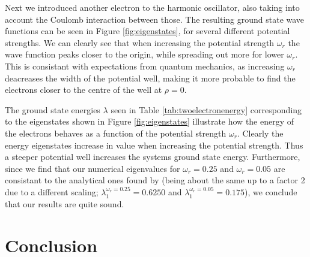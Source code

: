 \documentclass[twocolumn]{aastex62}
\begin{document}
Next we introduced another electron to the harmonic oscillator, also taking into account the Coulomb interaction between those. The resulting ground state wave functions can be seen in Figure \ref{fig:eigenstates}, for several different potential strengths. We can clearly see that when increasing the potential strength $\omega_r$ the wave function peaks closer to the origin, while spreading out more for lower $\omega_r$. This is consistant with expectations from quantum mechanics, as increasing $\omega_r$ deacreases the width of the potential well, making it more probable to find the electrons closer to the centre of the well at $\rho = 0$.

The ground state energies $\lambda$ seen in Table \ref{tab:twoelectronenergy} corresponding to the eigenstates shown in Figure \ref{fig:eigenstates} illustrate how the energy of the electrons behaves as a function of the potential strength $\omega_r$. Clearly the energy eigenstates increase in value when increasing the potential strength. Thus a steeper potential well increases the systems ground state energy. Furthermore, since we find that our numerical eigenvalues for $\omega_r = 0.25$ and $\omega_r = 0.05$ are consistant to the analytical ones found by \cite{taut:1993} (being about the same up to a factor 2 due to a different scaling; $\lambda_1^{\omega_r = 0.25} = 0.6250$ and $\lambda_1^{\omega_r = 0.05} = 0.175$), we conclude that our results are quite sound.

\section{Conclusion} \label{sec:conclusion}



\end{document}
